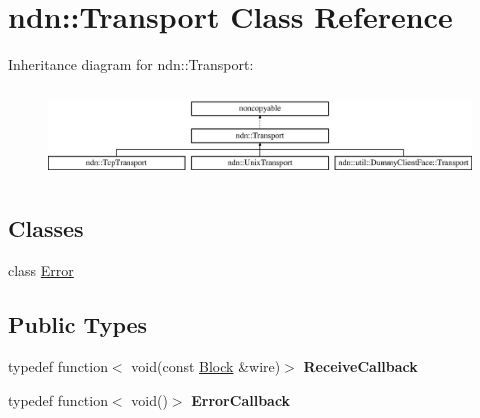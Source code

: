 \hypertarget{classndn_1_1Transport}{}\section{ndn\+:\+:Transport Class Reference}
\label{classndn_1_1Transport}
Inheritance diagram for ndn\+:\+:Transport\+:\begin{figure}[H]
\begin{center}
\leavevmode
\includegraphics[height=2.424242cm]{classndn_1_1Transport}
\end{center}
\end{figure}
\subsection*{Classes}
\begin{DoxyCompactItemize}
\item 
class \hyperlink{classndn_1_1Transport_1_1Error}{Error}
\end{DoxyCompactItemize}
\subsection*{Public Types}
\begin{DoxyCompactItemize}
\item 
typedef function$<$ void(const \hyperlink{classndn_1_1Block}{Block} \&wire)$>$ {\bfseries Receive\+Callback}\hypertarget{classndn_1_1Transport_a5fe0a601f488200564b84cc2a3a73816}{}\label{classndn_1_1Transport_a5fe0a601f488200564b84cc2a3a73816}

\item 
typedef function$<$ void()$>$ {\bfseries Error\+Callback}\hypertarget{classndn_1_1Transport_a261ec353089c446242afed151df3ad41}{}\label{classndn_1_1Transport_a261ec353089c446242afed151df3ad41}

\end{DoxyCompactItemize}
